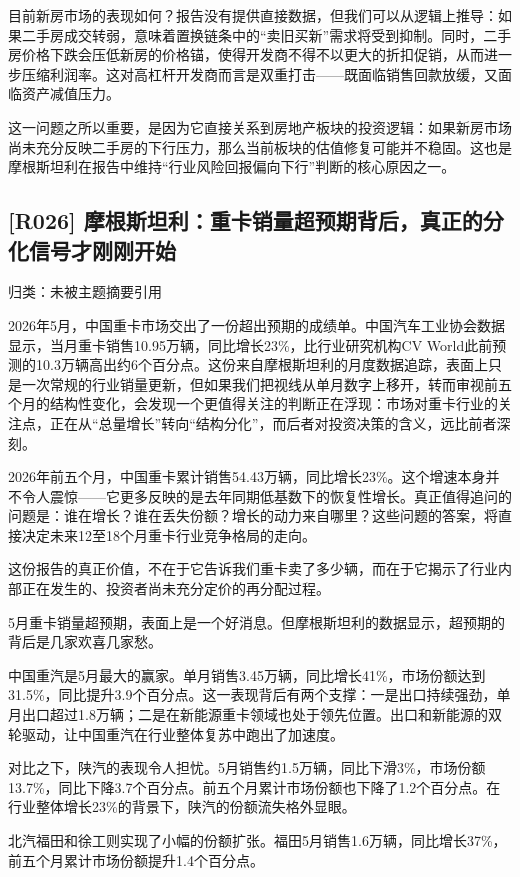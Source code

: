 \documentclass[11pt]{ctexart}
\begin{document}
目前新房市场的表现如何？报告没有提供直接数据，但我们可以从逻辑上推导：如果二手房成交转弱，意味着置换链条中的“卖旧买新”需求将受到抑制。同时，二手房价格下跌会压低新房的价格锚，使得开发商不得不以更大的折扣促销，从而进一步压缩利润率。这对高杠杆开发商而言是双重打击——既面临销售回款放缓，又面临资产减值压力。

这一问题之所以重要，是因为它直接关系到房地产板块的投资逻辑：如果新房市场尚未充分反映二手房的下行压力，那么当前板块的估值修复可能并不稳固。这也是摩根斯坦利在报告中维持“行业风险回报偏向下行”判断的核心原因之一。

\subsection{[R026] 摩根斯坦利：重卡销量超预期背后，真正的分化信号才刚刚开始}
{\small\color{refgray}归类：未被主题摘要引用}

2026年5月，中国重卡市场交出了一份超出预期的成绩单。中国汽车工业协会数据显示，当月重卡销售10.95万辆，同比增长23\%，比行业研究机构CV World此前预测的10.3万辆高出约6个百分点。这份来自摩根斯坦利的月度数据追踪，表面上只是一次常规的行业销量更新，但如果我们把视线从单月数字上移开，转而审视前五个月的结构性变化，会发现一个更值得关注的判断正在浮现：市场对重卡行业的关注点，正在从“总量增长”转向“结构分化”，而后者对投资决策的含义，远比前者深刻。

2026年前五个月，中国重卡累计销售54.43万辆，同比增长23\%。这个增速本身并不令人震惊——它更多反映的是去年同期低基数下的恢复性增长。真正值得追问的问题是：谁在增长？谁在丢失份额？增长的动力来自哪里？这些问题的答案，将直接决定未来12至18个月重卡行业竞争格局的走向。

这份报告的真正价值，不在于它告诉我们重卡卖了多少辆，而在于它揭示了行业内部正在发生的、投资者尚未充分定价的再分配过程。

5月重卡销量超预期，表面上是一个好消息。但摩根斯坦利的数据显示，超预期的背后是几家欢喜几家愁。

中国重汽是5月最大的赢家。单月销售3.45万辆，同比增长41\%，市场份额达到31.5\%，同比提升3.9个百分点。这一表现背后有两个支撑：一是出口持续强劲，单月出口超过1.8万辆；二是在新能源重卡领域也处于领先位置。出口和新能源的双轮驱动，让中国重汽在行业整体复苏中跑出了加速度。

对比之下，陕汽的表现令人担忧。5月销售约1.5万辆，同比下滑3\%，市场份额13.7\%，同比下降3.7个百分点。前五个月累计市场份额也下降了1.2个百分点。在行业整体增长23\%的背景下，陕汽的份额流失格外显眼。

北汽福田和徐工则实现了小幅的份额扩张。福田5月销售1.6万辆，同比增长37\%，前五个月累计市场份额提升1.4个百分点。
\end{document}
